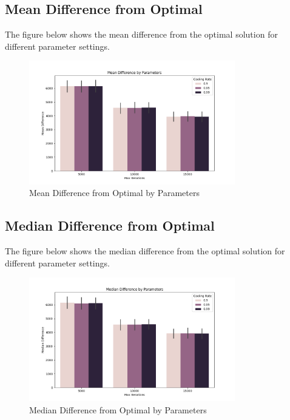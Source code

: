 \documentclass[
]{article}
\begin{document}
    \subsection{Mean Difference from Optimal}\label{subsec:mean-difference-from-optimal}

    The figure below shows the mean difference from the optimal solution for different parameter settings.

    \begin{figure}[H]
        \centering
        \includegraphics[width=0.8\textwidth]{simulated_annealing/mean_difference.png}
        \caption{Mean Difference from Optimal by Parameters}
        \label{fig:mean_difference}
    \end{figure}

    \subsection{Median Difference from Optimal}\label{subsec:median-difference-from-optimal}

    The figure below shows the median difference from the optimal solution for different parameter settings.

    \begin{figure}[H]
        \centering
        \includegraphics[width=0.8\textwidth]{simulated_annealing/median_difference.png}
        \caption{Median Difference from Optimal by Parameters}
        \label{fig:median_difference}
    \end{figure}
\end{document}

